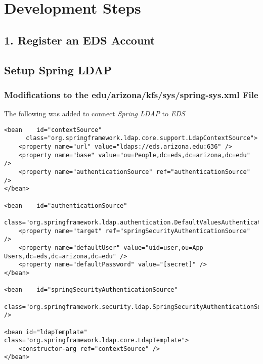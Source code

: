 \documentclass[12pt,notitlepage]{article}
\begin{document}
\section{Development Steps}

\subsection*{1. Register an EDS Account}

\subsection{Setup Spring LDAP}

\subsubsection{Modifications to the edu/arizona/kfs/sys/spring-sys.xml File}

The following was added to connect \emph{Spring LDAP} to \emph{EDS}

\begin{lstlisting}
<bean    id="contextSource"
      class="org.springframework.ldap.core.support.LdapContextSource">
    <property name="url" value="ldaps://eds.arizona.edu:636" />
    <property name="base" value="ou=People,dc=eds,dc=arizona,dc=edu" />
    <property name="authenticationSource" ref="authenticationSource" />
</bean>

<bean    id="authenticationSource"
      class="org.springframework.ldap.authentication.DefaultValuesAuthenticationSourceDecorator">
    <property name="target" ref="springSecurityAuthenticationSource" />
    <property name="defaultUser" value="uid=user,ou=App Users,dc=eds,dc=arizona,dc=edu" />
    <property name="defaultPassword" value="[secret]" />
</bean>

<bean    id="springSecurityAuthenticationSource"
      class="org.springframework.security.ldap.SpringSecurityAuthenticationSource" />

<bean id="ldapTemplate" class="org.springframework.ldap.core.LdapTemplate">
    <constructor-arg ref="contextSource" />
</bean>
\end{lstlisting}
\end{document}
